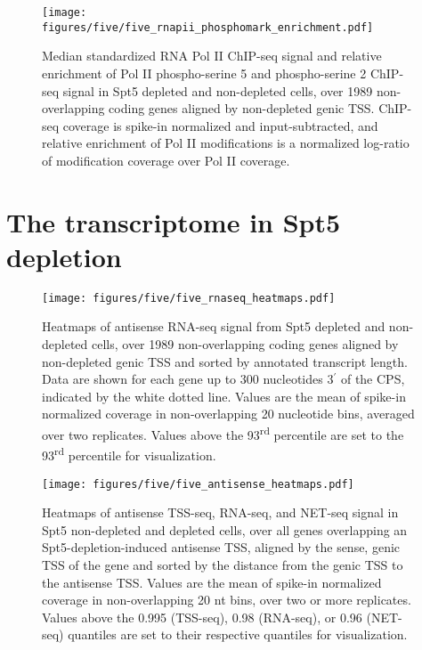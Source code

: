 \begin{figure}
    \texttt{[image: figures/five/five\_rnapii\_phosphomark\_enrichment.pdf]}
    \caption[Enrichment of RNA Pol II phospho-serine 5 and phospho-serine 2 over non-overlapping coding genes, in Spt5 depleted and non-depleted cells.]{Median standardized RNA Pol II ChIP-seq signal and relative enrichment of Pol II phospho-serine 5 and phospho-serine 2 ChIP-seq signal in Spt5 depleted and non-depleted cells, over 1989 non-overlapping coding genes aligned by non-depleted genic TSS. ChIP-seq coverage is spike-in normalized and input-subtracted, and relative enrichment of Pol II modifications is a normalized log-ratio of modification coverage over Pol II coverage.}
    \label{fig:five_rnapii_phosphomark_enrichment}
\end{figure}

\lipsum[1]

\section{The transcriptome in Spt5 depletion}
\label{sec:five_transcriptome}

\begin{figure}[H]
    \centering
    \texttt{[image: figures/five/five\_rnaseq\_heatmaps.pdf]}
    \caption[Heatmaps of antisense RNA-seq signal from Spt5 depleted and non-depleted cells, over non-overlapping coding genes.]{Heatmaps of antisense RNA-seq signal from Spt5 depleted and non-depleted cells, over 1989 non-overlapping coding genes aligned by non-depleted genic TSS and sorted by annotated transcript length. Data are shown for each gene up to 300 nucleotides 3$^\prime$ of the CPS, indicated by the white dotted line. Values are the mean of spike-in normalized coverage in non-overlapping 20 nucleotide bins, averaged over two replicates. Values above the 93\textsuperscript{rd} percentile are set to the 93\textsuperscript{rd} percentile for visualization.}
    \label{fig:five_rnaseq_heatmaps}
\end{figure}

\lipsum[1]

\begin{figure}[H]
    \centering
    \texttt{[image: figures/five/five\_antisense\_heatmaps.pdf]}
    \caption[Heatmaps of antisense TSS-seq, RNA-seq, and NET-seq signal from Spt5 depleted and non-depleted cells, over genes with Spt5-depletion-induced antisense TSSs.]{Heatmaps of antisense TSS-seq, RNA-seq, and NET-seq signal in Spt5 non-depleted and depleted cells, over all genes overlapping an Spt5-depletion-induced antisense TSS, aligned by the sense, genic TSS of the gene and sorted by the distance from the genic TSS to the antisense TSS. Values are the mean of spike-in normalized coverage in non-overlapping 20 nt bins, over two or more replicates. Values above the 0.995 (TSS-seq), 0.98 (RNA-seq), or 0.96 (NET-seq) quantiles are set to their respective quantiles for visualization.}
    \label{fig:five_antisense_heatmaps}
\end{figure}

